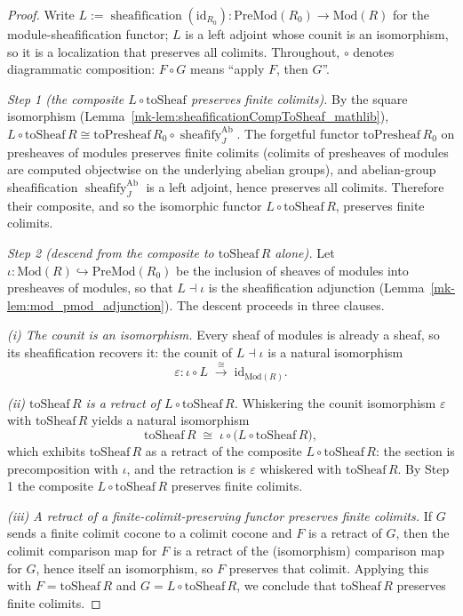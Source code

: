 \begin{proof}
  \leanok
  Write \(L := \operatorname{sheafification}(\mathrm{id}_{R_0}) : \mathrm{PreMod}(R_0) \to
  \mathrm{Mod}(R)\) for the module-sheafification functor; \(L\) is a left adjoint whose counit is an
  isomorphism, so it is a localization that preserves all colimits. Throughout, \(\circ\) denotes
  diagrammatic composition: \(F \circ G\) means ``apply \(F\), then \(G\)''.

  \emph{Step 1 (the composite \(L \circ \mathrm{toSheaf}\) preserves finite colimits).} By the
  square isomorphism (Lemma~\ref{mk-lem:sheafificationCompToSheaf_mathlib}),
  \(L \circ \mathrm{toSheaf}\,R \cong \mathrm{toPresheaf}\,R_0 \circ
  \operatorname{sheafify}_J^{\mathrm{Ab}}\). The forgetful functor \(\mathrm{toPresheaf}\,R_0\) on
  presheaves of modules preserves finite colimits (colimits of presheaves of modules are computed
  objectwise on the underlying abelian groups), and abelian-group sheafification
  \(\operatorname{sheafify}_J^{\mathrm{Ab}}\) is a left adjoint, hence preserves all colimits.
  Therefore their composite, and so the isomorphic functor \(L \circ \mathrm{toSheaf}\,R\), preserves
  finite colimits.

  \emph{Step 2 (descend from the composite to \(\mathrm{toSheaf}\,R\) alone).} Let
  \(\iota : \mathrm{Mod}(R) \hookrightarrow \mathrm{PreMod}(R_0)\) be the inclusion of sheaves of
  modules into presheaves of modules, so that \(L \dashv \iota\) is the sheafification adjunction
  (Lemma~\ref{mk-lem:mod_pmod_adjunction}). The descent proceeds in three clauses.

  \emph{(i) The counit is an isomorphism.} Every sheaf of modules is already a sheaf, so its
  sheafification recovers it: the counit of \(L \dashv \iota\) is a natural isomorphism
  \[
    \varepsilon : \iota \circ L \;\xrightarrow{\;\cong\;}\; \mathrm{id}_{\mathrm{Mod}(R)} .
  \]

  \emph{(ii) \(\mathrm{toSheaf}\,R\) is a retract of \(L \circ \mathrm{toSheaf}\,R\).} Whiskering the
  counit isomorphism \(\varepsilon\) with \(\mathrm{toSheaf}\,R\) yields a natural isomorphism
  \[
    \mathrm{toSheaf}\,R \;\cong\; \iota \circ \bigl(L \circ \mathrm{toSheaf}\,R\bigr),
  \]
  which exhibits \(\mathrm{toSheaf}\,R\) as a retract of the composite \(L \circ \mathrm{toSheaf}\,R\):
  the section is precomposition with \(\iota\), and the retraction is \(\varepsilon\) whiskered with
  \(\mathrm{toSheaf}\,R\). By Step 1 the composite \(L \circ \mathrm{toSheaf}\,R\) preserves finite
  colimits.

  \emph{(iii) A retract of a finite-colimit-preserving functor preserves finite colimits.} If \(G\)
  sends a finite colimit cocone to a colimit cocone and \(F\) is a retract of \(G\), then the colimit
  comparison map for \(F\) is a retract of the (isomorphism) comparison map for \(G\), hence itself an
  isomorphism, so \(F\) preserves that colimit. Applying this with \(F = \mathrm{toSheaf}\,R\) and
  \(G = L \circ \mathrm{toSheaf}\,R\), we conclude that \(\mathrm{toSheaf}\,R\) preserves finite
  colimits.
\end{proof}


